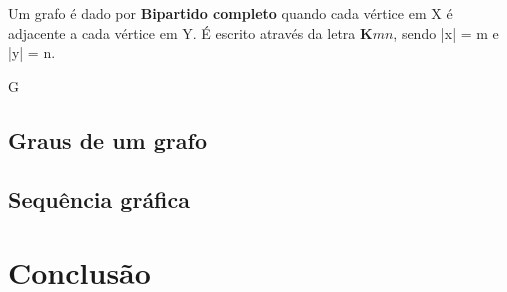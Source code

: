 \documentclass[a4paper, 12pt]{article}
\begin{document}
Um grafo é dado por \textbf{Bipartido completo} quando cada vértice em X é adjacente a cada vértice em Y. É escrito através da letra $\textbf{K}{mn}$, sendo |x| = m e |y| = n.

\begin{center}
	G\:


	\caption{$X = \{V1, V2\}$ $Y = \{V3, V4, V5\}$}
\end{center}


\subsection{Graus de um grafo}
\subsection{Sequência gráfica}
\section{Conclusão}
\end{document}
